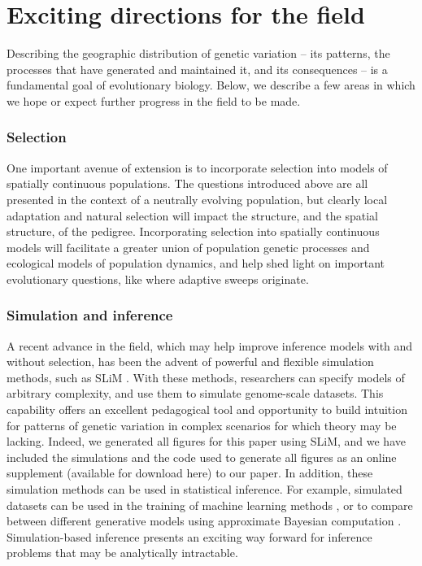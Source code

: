 \documentclass{ar-1col}
\newcommand{\g}[1]{{\color{blue}{#1}}}
\begin{document}
\section{Exciting directions for the field}

Describing the geographic distribution of genetic variation -- 
its patterns, 
the processes that have generated and maintained it, 
and its consequences -- 
is a fundamental goal of evolutionary biology.
Below, we describe a few areas 
in which we hope or expect further progress in the field to be made.

\subsubsection{Selection}
One important avenue of extension is to incorporate selection into 
models of spatially continuous populations. 
The questions introduced above are all presented in the context 
of a neutrally evolving population,
but clearly local adaptation and natural selection will impact 
the structure, and the spatial structure, of the pedigree.
Incorporating selection into spatially continuous models 
will facilitate a greater union of population genetic processes 
and ecological models of population dynamics, 
and help shed light on important evolutionary questions, 
like where adaptive sweeps originate. 
\g{more about why this is hard?}

\subsubsection{Simulation and inference} 
A recent advance in the field, 
which may help improve inference models with and without selection, 
has been the advent of powerful and flexible simulation methods, 
such as SLiM \citep{haller2018forward,haller2018treesequence,kelleher2018efficient}.
With these methods, 
researchers can specify models of arbitrary complexity, 
and use them to simulate genome-scale datasets.
This capability offers an excellent pedagogical tool 
and opportunity to build intuition for patterns of genetic variation 
in complex scenarios for which theory may be lacking.
Indeed, we generated all figures for this paper using SLiM, 
and we have included the simulations 
and the code used to generate all figures 
as an online supplement (available for download here) 
to our paper.
In addition, these simulation methods can be used in statistical inference.
For example, simulated datasets can be used in the training 
of machine learning methods \citep[e.g.,][]{flagel2018unreasonable}, 
or to compare between different generative models using 
approximate Bayesian computation \citep{MarjoramTavare2006modern}.
Simulation-based inference presents an exciting way forward 
for inference problems that may be analytically intractable.
\end{document}
